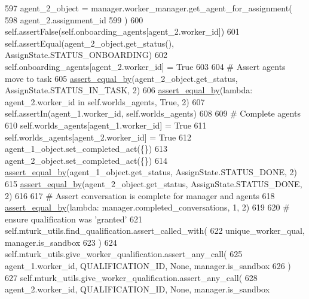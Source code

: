\begin{DoxyCode}
597         agent\_2\_object = manager.worker\_manager.get\_agent\_for\_assignment(
598             agent\_2.assignment\_id
599         )
600         self.assertFalse(self.onboarding\_agents[agent\_2.worker\_id])
601         self.assertEqual(agent\_2\_object.get\_status(), AssignState.STATUS\_ONBOARDING)
602         self.onboarding\_agents[agent\_2.worker\_id] = \textcolor{keyword}{True}
603 
604         \textcolor{comment}{# Assert agents move to task}
605         \hyperlink{namespaceparlai_1_1mturk_1_1core_1_1test_1_1test__full__system_a0b463246d35658a2e422010f13dcf819}{assert\_equal\_by}(agent\_2\_object.get\_status, AssignState.STATUS\_IN\_TASK, 2)
606         \hyperlink{namespaceparlai_1_1mturk_1_1core_1_1test_1_1test__full__system_a0b463246d35658a2e422010f13dcf819}{assert\_equal\_by}(\textcolor{keyword}{lambda}: agent\_2.worker\_id \textcolor{keywordflow}{in} self.worlds\_agents, \textcolor{keyword}{True}, 2)
607         self.assertIn(agent\_1.worker\_id, self.worlds\_agents)
608 
609         \textcolor{comment}{# Complete agents}
610         self.worlds\_agents[agent\_1.worker\_id] = \textcolor{keyword}{True}
611         self.worlds\_agents[agent\_2.worker\_id] = \textcolor{keyword}{True}
612         agent\_1\_object.set\_completed\_act(\{\})
613         agent\_2\_object.set\_completed\_act(\{\})
614         \hyperlink{namespaceparlai_1_1mturk_1_1core_1_1test_1_1test__full__system_a0b463246d35658a2e422010f13dcf819}{assert\_equal\_by}(agent\_1\_object.get\_status, AssignState.STATUS\_DONE, 2)
615         \hyperlink{namespaceparlai_1_1mturk_1_1core_1_1test_1_1test__full__system_a0b463246d35658a2e422010f13dcf819}{assert\_equal\_by}(agent\_2\_object.get\_status, AssignState.STATUS\_DONE, 2)
616 
617         \textcolor{comment}{# Assert conversation is complete for manager and agents}
618         \hyperlink{namespaceparlai_1_1mturk_1_1core_1_1test_1_1test__full__system_a0b463246d35658a2e422010f13dcf819}{assert\_equal\_by}(\textcolor{keyword}{lambda}: manager.completed\_conversations, 1, 2)
619 
620         \textcolor{comment}{# ensure qualification was 'granted'}
621         self.mturk\_utils.find\_qualification.assert\_called\_with(
622             unique\_worker\_qual, manager.is\_sandbox
623         )
624         self.mturk\_utils.give\_worker\_qualification.assert\_any\_call(
625             agent\_1.worker\_id, QUALIFICATION\_ID, \textcolor{keywordtype}{None}, manager.is\_sandbox
626         )
627         self.mturk\_utils.give\_worker\_qualification.assert\_any\_call(
628             agent\_2.worker\_id, QUALIFICATION\_ID, \textcolor{keywordtype}{None}, manager.is\_sandbox

\end{DoxyCode}

